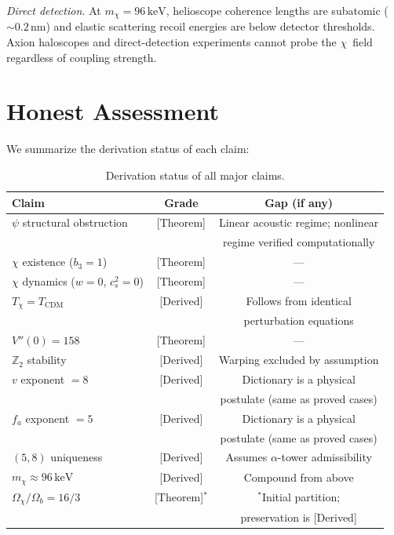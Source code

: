 \documentclass[aps,prd,twocolumn,superscriptaddress,showpacs,floatfix,nofootinbib]{revtex4-2}
\theoremstyle{definition}
\theoremstyle{remark}
\newcommand{\keV}{\,\mathrm{keV}}
\newcommand{\grade}[1]{\textsf{\footnotesize [#1]}}
\begin{document}
\emph{Direct detection.} At $m_\chi=96\keV$, helioscope
coherence lengths are subatomic (${\sim}0.2$\,nm) and
elastic scattering recoil energies are below detector
thresholds. Axion haloscopes and direct-detection
experiments cannot probe the $\chi$~field regardless of
coupling strength.

\section{Honest Assessment}
\label{sec:assessment}

We summarize the derivation status of each claim:

\begin{table}[b]
\caption{Derivation status of all major claims.}
\label{tab:grades}
\begin{ruledtabular}
\begin{tabular}{lcc}
Claim & Grade & Gap (if any) \\
\hline
$\psi$ structural obstruction & \grade{Theorem} & Linear acoustic
  regime; nonlinear \\
& & regime verified
  computationally \\
$\chi$ existence ($b_3{=}1$) & \grade{Theorem} & --- \\
$\chi$ dynamics ($w{=}0$, $c_s^2{=}0$) & \grade{Theorem} & --- \\
$T_\chi = T_{\mathrm{CDM}}$ & \grade{Derived} &
  Follows from identical \\
& & perturbation equations \\
$V''(0)=158$ & \grade{Theorem} & --- \\
$\mathbb{Z}_2$ stability & \grade{Derived} & Warping excluded
  by assumption \\
$v$ exponent $=8$ & \grade{Derived} & Dictionary is a
  physical \\
& & postulate (same as
  proved cases) \\
$f_a$ exponent $=5$ & \grade{Derived} & Dictionary is a
  physical \\
& & postulate (same as
  proved cases) \\
$(5,8)$ uniqueness & \grade{Derived} & Assumes $\alpha$-tower
  admissibility \\
$m_\chi \approx 96\keV$ & \grade{Derived} & Compound from
  above \\
$\Omega_\chi/\Omega_b=16/3$ & \grade{Theorem}${}^*$ &
  ${}^*$Initial partition; \\
& & preservation is
  \grade{Derived} \\
\end{tabular}
\end{ruledtabular}
\end{table}
\end{document}

